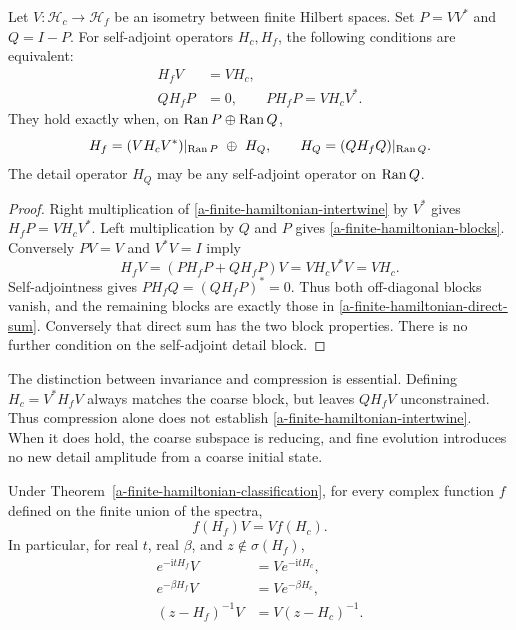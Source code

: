 \begin{theorem}
\label{a-finite-hamiltonian-classification}
Let $V:\mathcal H_c\to\mathcal H_f$ be an isometry between finite
Hilbert spaces. Set $P=VV^*$ and $Q=I-P$. For self-adjoint operators
$H_c,H_f$, the following conditions are equivalent:
\begin{align}
 H_fV&=VH_c,\label{a-finite-hamiltonian-intertwine}\\
 QH_fP&=0,\qquad PH_fP=VH_cV^*.
 \label{a-finite-hamiltonian-blocks}
\end{align}
They hold exactly when, on $\operatorname{Ran} P\oplus\operatorname{Ran} Q$,
\begin{equation}
 H_f=(VH_cV^*)|_{\operatorname{Ran} P}\ \oplus\ H_Q,
 \qquad H_Q=(QH_fQ)|_{\operatorname{Ran} Q}.
 \label{a-finite-hamiltonian-direct-sum}
\end{equation}
The detail operator $H_Q$ may be any self-adjoint operator on
$\operatorname{Ran} Q$.
\end{theorem}

\begin{proof}
Right multiplication of \eqref{a-finite-hamiltonian-intertwine} by
$V^*$ gives $H_fP=VH_cV^*$. Left multiplication by $Q$ and $P$
gives \eqref{a-finite-hamiltonian-blocks}. Conversely $PV=V$ and
$V^*V=I$ imply
\[
 H_fV=(PH_fP+QH_fP)V=VH_cV^*V=VH_c.
\]
Self-adjointness gives $PH_fQ=(QH_fP)^*=0$. Thus both off-diagonal
blocks vanish, and the remaining blocks are exactly those in
\eqref{a-finite-hamiltonian-direct-sum}. Conversely that direct sum
has the two block properties. There is no further condition on the
self-adjoint detail block.
\end{proof}

The distinction between invariance and compression is essential.
Defining $H_c=V^*H_fV$ always matches the coarse block, but leaves
$QH_fV$ unconstrained. Thus compression alone does not establish
\eqref{a-finite-hamiltonian-intertwine}. When it does hold, the coarse
subspace is reducing, and fine evolution introduces no new detail
amplitude from a coarse initial state.

\begin{corollary}
\label{a-finite-functional-calculus}
Under Theorem~\ref{a-finite-hamiltonian-classification}, for every
complex function $f$ defined on the finite union of the spectra,
\[
 f(H_f)V=Vf(H_c).
\]
In particular, for real $t$, real $\beta$, and
$z\notin\sigma(H_f)$,
\begin{align}
 e^{-\mathrm{i}tH_f}V&=Ve^{-\mathrm{i}tH_c},\nonumber\\
 e^{-\beta H_f}V&=Ve^{-\beta H_c},\nonumber\\
 (z-H_f)^{-1}V&=V(z-H_c)^{-1}.
 \label{a-finite-evolution-intertwining}
\end{align}
\end{corollary}


